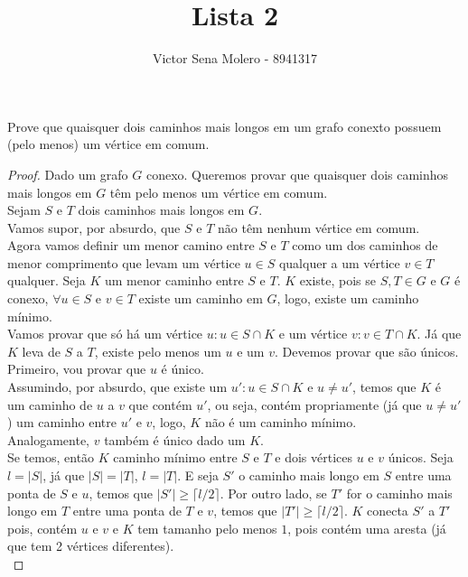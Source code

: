 \documentclass[12pt]{article}
\newenvironment{problem}[2][Ex]{\begin{trivlist}
\item[\hskip \labelsep {\bfseries #1}\hskip \labelsep {\bfseries #2.}]}{\end{trivlist}}
\begin{document}
 
 
\title{Lista 2}
\author{Victor Sena Molero - 8941317}
\maketitle

\begin{problem}{E6}
Prove que quaisquer dois caminhos mais longos em um grafo conexto possuem (pelo menos) um vértice em comum.
\end{problem}

\begin{proof}
Dado um grafo $G$ conexo. Queremos provar que quaisquer dois caminhos mais longos em $G$ têm pelo menos um vértice em comum. \\ 
Sejam $S$ e $T$ dois caminhos mais longos em $G$. \\
Vamos supor, por absurdo, que $S$ e $T$ não têm nenhum vértice em comum. \\
Agora vamos definir um menor camino entre $S$ e $T$ como um dos caminhos de menor comprimento que levam um vértice $u \in S$ qualquer a um vértice $v \in T$ qualquer. Seja $K$ um menor caminho entre $S$ e $T$. $K$ existe, pois se $S,T \in G$ e $G$ é conexo, $\forall u \in S \text{ e } v \in T$ existe um caminho em $G$, logo, existe um caminho mínimo. \\
Vamos provar que só há um vértice $u : u \in S \cap K$ e um vértice $v : v \in T  \cap K$. Já que $K$ leva de $S$ a $T$, existe pelo menos um $u$ e um $v$. Devemos provar que são únicos. Primeiro, vou provar que $u$ é único. \\
Assumindo, por absurdo, que existe um $u': u \in S \cap K \text{ e } u \neq u'$, temos que $K$ é um caminho de $u$ a $v$ que contém $u'$, ou seja, contém propriamente (já que $u \neq u'$) um caminho entre $u'$ e $v$, logo, $K$ não é um caminho mínimo. \\
Analogamente, $v$ também é único dado um $K$. \\
Se temos, então $K$ caminho mínimo entre $S$ e $T$ e dois vértices $u$ e $v$ únicos. Seja $l = |S|$, já que $|S| = |T|$, $l = |T|$. E seja $S'$ o caminho mais longo em $S$ entre uma ponta de $S$ e $u$, temos que $|S'| \geq \lceil l/2 \rceil$. Por outro lado, se $T'$ for o caminho mais longo em $T$ entre uma ponta de $T$ e $v$, temos que $|T'| \geq \lceil l/2 \rceil$. $K$ conecta $S'$ a $T'$ pois, contém $u$ e $v$ e $K$ tem tamanho pelo menos $1$, pois contém uma aresta (já que tem 2 vértices diferentes). \\

\end{proof}
\end{document}
